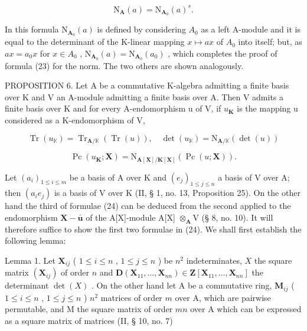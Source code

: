\[
\mathrm{N} _ {\mathbf {A}} (a) = \mathrm{N} _ {\mathbf {A} _ {0}} (a) ^ {s}.
\]

In this formula \(\mathrm{N}_{\mathbf{A}_{0}}(a)\) is defined by considering \(A_{0}\) as a left A-module and it is equal to the determinant of the K-linear mapping \(x \mapsto ax\) of \(A_{0}\) into itself; but, as \(ax = a_{0}x\) for \(x \in A_{0}\) , \(\mathrm{N}_{\mathbf{A}_{0}}(a) = \mathrm{N}_{\mathbf{A}_{0}}(a_{0})\) , which completes the proof of formula (23) for the norm. The two others are shown analogously.

PROPOSITION 6. Let A be a commutative K-algebra admitting a finite basis over K and V an A-module admitting a finite basis over A. Then V admits a finite basis over K and for every A-endomorphism u of V, if \(u_{\mathbf{K}}\) is the mapping u considered as a K-endomorphism of V,

\[
\operatorname{Tr} (u _ {\mathbb {K}}) = \operatorname{Tr} _ {\mathbf {A} / \mathbb {K}} (\operatorname{Tr} (u)), \quad \det (u _ {\mathbb {K}}) = \mathrm{N} _ {\mathbf {A} / \mathbb {K}} (\det (u))\tag{24}
\]

\[
\operatorname{Pc} (u _ {\mathbf {K}}; \mathbf {X}) = \mathrm{N} _ {\mathbf {A} [ \mathbf {X} ] / \mathbf {K} [ \mathbf {X} ]} (\operatorname{Pc} (u; \mathbf {X})).
\]

Let \((a_{i})_{1\leqslant i\leqslant m}\) be a basis of A over K and \((e_{j})_{1\leqslant j\leqslant n}\) a basis of V over A; then \((a_{i}e_{j})\) is a basis of V over K (II, § 1, no. 13, Proposition 25). On the other hand the third of formulae (24) can be deduced from the second applied to the endomorphism \(\mathbf{X} - \bar{\boldsymbol{u}}\) of the A{[}X{]}-module A{[}X{]} \(\otimes_{\mathbf{A}}\mathrm{V}\) (§ 8, no. 10). It will therefore suffice to show the first two formulae in (24). We shall first establish the following lemma:

Lemma 1. Let \(\mathbf{X}_{ij}\) ( \(1 \leqslant i \leqslant n\) , \(1 \leqslant j \leqslant n\) ) be \(n^2\) indeterminates, \(X\) the square matrix \((\mathbf{X}_{ij})\) of order \(n\) and \(\mathbf{D}(\mathbf{X}_{11}, \ldots, \mathbf{X}_{nn}) \in \mathbf{Z}[\mathbf{X}_{11}, \ldots, \mathbf{X}_{nn}]\) the determinant \(\det(X)\) . On the other hand let A be a commutative ring, \(\mathbf{M}_{ij}\) ( \(1 \leqslant i \leqslant n\) , \(1 \leqslant j \leqslant n\) ) \(n^2\) matrices of order \(m\) over A, which are pairwise permutable, and M the square matrix of order \(mn\) over A which can be expressed as a square matrix of matrices (II, § 10, no. 7)

